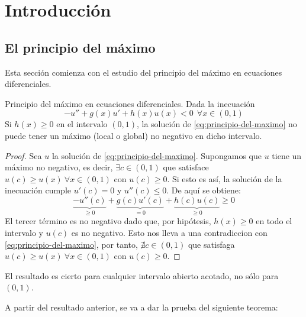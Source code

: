 \section{Introducción}
\subsection{El principio del máximo}

Esta sección comienza con el estudio del principio del máximo en ecuaciones diferenciales.
\begin{mathresult}{Principio del máximo en ecuaciones diferenciales.}
Dada la inecuación 
\begin{equation}
\label{eq:principio-del-maximo}
-u''+g(x)u'+h(x)u(x) < 0 \ \ \forall x \in (0,1) 
\end{equation}
Si $h(x) \ge 0$ en el intervalo $(0,1)$, la solución de \eqref{eq:principio-del-maximo} no puede tener un máximo (local o global) no negativo en dicho intervalo.
\end{mathresult}
\begin{proof}
Sea $u$ la solución de \eqref{eq:principio-del-maximo}. Supongamos que $u$ tiene un máximo no negativo, es decir, $\exists c\in (0,1)$ que satisface $u(c) \ge u(x) \ \forall x \in (0,1)$ con $u(c)\ge 0$.
Si esto es así, la solución de la inecuación cumple $u'(c)=0$ y $u''(c) \le 0$. De aquí se obtiene:
$$\underbrace{-u''(c)}_{\ge 0}+\underbrace{g(c)u'(c)}_{=0}+\underbrace{h(c)u(c)}_{\ge 0} \ge 0$$
El tercer término es no negativo dado que, por hipótesis, $h(x) \ge 0$ en todo el intervalo y $u(c)$ es no negativo.
Esto nos lleva a una contradiccion con \eqref{eq:principio-del-maximo}, por tanto, $\nexists c \in (0,1)$ que satisfaga $u(c) \ge u(x) \ \forall x \in (0,1)$ con $u(c)\ge 0$.
\end{proof}
\see El resultado es cierto para cualquier intervalo abierto acotado, no sólo para $(0,1)$.

A partir del resultado anterior, se va a dar la prueba del siguiente teorema:

